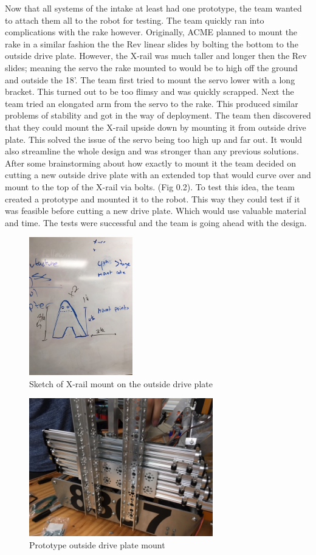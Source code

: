 \documentclass{article}
\begin{document}
Now that all systems of the intake at least had one prototype, the team wanted to attach them all to the robot for testing. The team quickly ran into complications with the rake however. Originally, ACME planned to mount the rake in a similar fashion the the Rev linear slides by bolting the bottom to the outside drive plate. However, the X-rail was much taller and longer then the Rev slides; meaning the servo the rake mounted to would be to high off the ground and outside the 18'. The team first tried to mount the servo lower with a long bracket. This turned out to be too flimsy and was quickly scrapped. Next the team tried an elongated arm from the servo to the rake. This produced similar problems of stability and got in the way of deployment. The team then discovered that they could mount the X-rail upside down by mounting it from outside drive plate. This solved the issue of the servo being too high up and far out. It would also streamline the whole design and was stronger than any previous solutions. After some brainstorming about how exactly to mount it the team decided on cutting a new outside drive plate with an extended top that would curve over and mount to the top of the X-rail via bolts. (Fig 0.2). To test this idea, the team created a prototype and mounted it to the robot. This way they could test if it was feasible before cutting a new drive plate. Which would use valuable material and time. The tests were successful and the team is going ahead with the design. 

\begin{figure}
    \centering
    \includegraphics[height=6cm]{16_12-17/images/x-rail_mount.JPG}
    \caption{Sketch of X-rail mount on the outside drive plate}
    \label{fig:Mount Sketch}
\end{figure}

\begin{figure}
    \centering
    \includegraphics[height=6cm]{16_12-17/images/mount_proto.JPG}
    \caption{Prototype outside drive plate mount}
    \label{Prototype Mount}
\end{figure}
\end{document}
